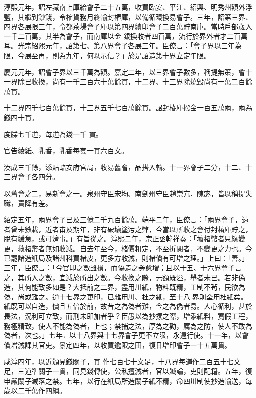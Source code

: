 \begin{pinyinscope}
 淳熙元年，詔左藏南上庫給會子二十五萬，收買臨安、平江、紹興、明秀州額外浮鹽，其繼到鈔錢，令榷貨務月終輸封樁庫，以備循環換易會子。三年，詔第三界、四界各展限三年，令都茶場會子庫以第四界續印會子二百萬貯南庫。當時戶部歲入一千二百萬，其半為會子，而南庫以金
 銀換收者四百萬，流行於界外者才二百萬耳。光宗紹熙元年，詔第七、第八界會子各展三年。臣僚言：「會子界以三年為限，今展至再，則為九年，何以示信？」於是詔造第十界立定年限。



 慶元元年，詔會子界以三千萬為額。嘉定二年，以三界會子數多，稱提無策，會十一界除已收換，尚有一千三百六十萬餘貫，十二界、十三界除燒毀尚有一萬二百餘萬貫。



 十二界四千七百萬餘貫，十三界五千七百萬餘貫。詔封樁庫撥金一百五萬兩，兩為錢四十貫。



 度牒七千道，每道為錢一千
 貫。



 官告綾紙、乳香，乳香每套一貫六百文。



 湊成三千餘，添貼臨安府官局，收易舊會，品搭入輸。十一界會子二分，十二、十三界會子各四分。



 以舊會之二，易新會之一。泉州守臣宋均、南劍州守臣趙崇亢、陳宓，皆以稱提失職，責降有差。



 紹定五年，兩界會子已及三億二千九百餘萬。端平二年，臣僚言：「兩界會子，遠者曾未數載，近者甫及期年，非有破壞塗污之弊，今當以所收之會付封樁庫貯之，脫有緩急，或可濟事。」有旨從之。淳熙二年，宗正丞韓祥奏：「壞楮幣者只緣變
 更，救楮幣者無如收減。自去年至今，楮價粗定，不至折閱者，不變更之力也。今已罷諸造紙局及諸州科買楮皮，更多方收減，則楮價有可增之理。」上曰：「善。」三年，臣僚言：「今官印之數雖損，而偽造之券愈增；且以十五、十六界會子言之，其所入之數，宜減於所出之數。今收換之際，元額既溢，舉者未已。若非偽造，其何能致多如是？大抵前之二界，盡用川紙，物料既精，工制不茍，民欲為偽，尚或難之。迨十七界之更印，已雜用川、杜之紙，至十八
 界則全用杜紙矣。紙既可以自造，價且五倍於前，故昔之為偽者難，今之為偽者易。人心循利，甚於畏法，況利可立致，而刑未即加者乎？臣愚以為抄撩之際，增添紙料，寬假工程，務極精致，使人不能為偽者，上也；禁捕之法，厚為之勸，厲為之防，使人不敢為偽者，次也。」七年，以十八界與十七界會子更不立限，永遠行使。十一年，以會價增減課其官吏。景定四年，以收買逾限之田，復日增印會子一十五萬貫。



 咸淳四年，以近頒見錢關子，貫
 作七百七十文足，十八界每道作二百五十七文足，三道準關子一貫，同見錢轉使，公私擅減者，官以贓論，吏則配籍。五年，復申嚴關子減落之禁。七年，以行在紙局所造關子紙不精，命四川制使抄造輸送，每歲以二千萬作四綱。




\end{pinyinscope}
